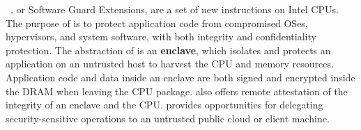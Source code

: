 \label{sec:intro:sgx}


\sgx{}~\cite{intelsgx}, or Software Guard Extensions, are a set of new instructions on Intel CPUs.
The purpose of \sgx{}
is to protect application code from compromised OSes, hypervisors, and system software,
with both integrity and confidentiality protection.
The abstraction of \sgx{} is 
an {\bf enclave}, 
which isolates and protects an application
on an untrusted host
to harvest the CPU and memory resources.
Application code and data inside an enclave are both signed and encrypted
inside the DRAM
when leaving the CPU package.
\sgx{} also offers remote attestation of the integrity of an enclave
and the CPU.
\sgx{} provides opportunities for delegating security-sensitive operations
to an untrusted public cloud
or client machine.





